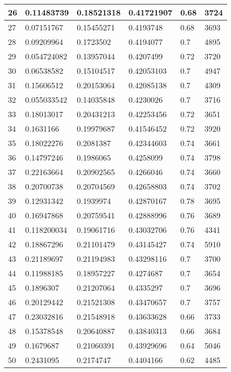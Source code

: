 \begin{longtable}{|l|l|l|l|l|l|}
26 & 0.11483739 & 0.18521318 & 0.41721907 & 0.68 & 3724 \\ \hline 
27 & 0.07151767 & 0.15455271 & 0.4193748 & 0.68 & 3693 \\ \hline 
28 & 0.09209964 & 0.1723502 & 0.4194077 & 0.7 & 4895 \\ \hline 
29 & 0.054724082 & 0.13957044 & 0.4207499 & 0.72 & 3720 \\ \hline 
30 & 0.06538582 & 0.15104517 & 0.42053103 & 0.7 & 4947 \\ \hline 
31 & 0.15606512 & 0.20153064 & 0.42085138 & 0.7 & 4309 \\ \hline 
32 & 0.055033542 & 0.14035848 & 0.4230026 & 0.7 & 3716 \\ \hline 
33 & 0.18013017 & 0.20431213 & 0.42253456 & 0.72 & 3651 \\ \hline 
34 & 0.1631166 & 0.19979687 & 0.41546452 & 0.72 & 3920 \\ \hline 
35 & 0.18022276 & 0.2081387 & 0.42344603 & 0.74 & 3661 \\ \hline 
36 & 0.14797246 & 0.1986065 & 0.4258099 & 0.74 & 3798 \\ \hline 
37 & 0.22163664 & 0.20902565 & 0.4266046 & 0.74 & 3660 \\ \hline 
38 & 0.20700738 & 0.20704569 & 0.42658803 & 0.74 & 3702 \\ \hline 
39 & 0.12931342 & 0.1939974 & 0.42870167 & 0.78 & 3695 \\ \hline 
40 & 0.16947868 & 0.20759541 & 0.42888996 & 0.76 & 3689 \\ \hline 
41 & 0.118200034 & 0.19061716 & 0.43032706 & 0.76 & 4341 \\ \hline 
42 & 0.18867296 & 0.21101479 & 0.43145427 & 0.74 & 5910 \\ \hline 
43 & 0.21189697 & 0.21194983 & 0.43298116 & 0.7 & 3700 \\ \hline 
44 & 0.11988185 & 0.18957227 & 0.4274687 & 0.7 & 3654 \\ \hline 
45 & 0.1896307 & 0.21207064 & 0.4335297 & 0.7 & 3696 \\ \hline 
46 & 0.20129442 & 0.21521308 & 0.43470657 & 0.7 & 3757 \\ \hline 
47 & 0.23032816 & 0.21548918 & 0.43633628 & 0.66 & 3733 \\ \hline 
48 & 0.15378548 & 0.20640887 & 0.43840313 & 0.66 & 3684 \\ \hline 
49 & 0.1679687 & 0.21060391 & 0.43929696 & 0.64 & 5046 \\ \hline 
50 & 0.2431095 & 0.2174747 & 0.4404166 & 0.62 & 4485 \\ \hline 
\end{longtable}